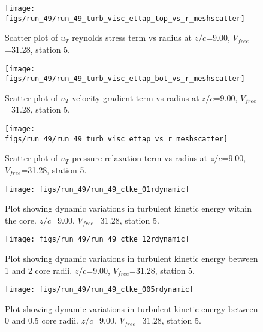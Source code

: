 \begin{figure}[H]
\centering
\texttt{[image: figs/run\_49/run\_49\_turb\_visc\_ettap\_top\_vs\_r\_meshscatter]}
\caption{Scatter plot of $
u_T$ reynolds stress term vs radius at $z/c$=9.00, $V_{free}$=31.28, station 5.}
\label{fig:run_49_turb_visc_ettap_top_vs_r_meshscatter}
\end{figure}


\begin{figure}[H]
\centering
\texttt{[image: figs/run\_49/run\_49\_turb\_visc\_ettap\_bot\_vs\_r\_meshscatter]}
\caption{Scatter plot of $
u_T$ velocity gradient term vs radius at $z/c$=9.00, $V_{free}$=31.28, station 5.}
\label{fig:run_49_turb_visc_ettap_bot_vs_r_meshscatter}
\end{figure}


\begin{figure}[H]
\centering
\texttt{[image: figs/run\_49/run\_49\_turb\_visc\_ettap\_vs\_r\_meshscatter]}
\caption{Scatter plot of $
u_T$ pressure relaxation term vs radius at $z/c$=9.00, $V_{free}$=31.28, station 5.}
\label{fig:run_49_turb_visc_ettap_vs_r_meshscatter}
\end{figure}


\begin{figure}[H]
\centering
\texttt{[image: figs/run\_49/run\_49\_ctke\_01rdynamic]}
\caption{Plot showing dynamic variations in turbulent kinetic energy within the core. $z/c$=9.00, $V_{free}$=31.28, station 5.}
\label{fig:run_49_ctke_01rdynamic}
\end{figure}


\begin{figure}[H]
\centering
\texttt{[image: figs/run\_49/run\_49\_ctke\_12rdynamic]}
\caption{Plot showing dynamic variations in turbulent kinetic energy between 1 and 2 core radii. $z/c$=9.00, $V_{free}$=31.28, station 5.}
\label{fig:run_49_ctke_12rdynamic}
\end{figure}


\begin{figure}[H]
\centering
\texttt{[image: figs/run\_49/run\_49\_ctke\_005rdynamic]}
\caption{Plot showing dynamic variations in turbulent kinetic energy between 0 and 0.5 core radii. $z/c$=9.00, $V_{free}$=31.28, station 5.}
\label{fig:run_49_ctke_005rdynamic}
\end{figure}


